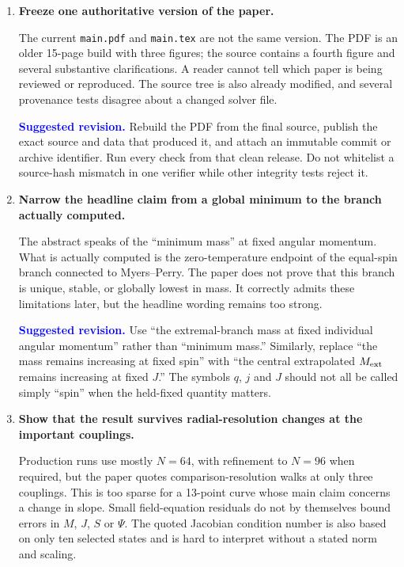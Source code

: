 \documentclass[11pt,a4paper]{article}
\newcommand{\issue}[1]{\textcolor{critical}{\textbf{#1}}}
\newcommand{\suggestion}[1]{\par\smallskip\noindent\textcolor{blue}{\textbf{Suggested revision.}} #1}
\begin{document}
\begin{enumerate}
\item \issue{Freeze one authoritative version of the paper.}

The current \texttt{main.pdf} and \texttt{main.tex} are not the same version.  The PDF is an older 15-page build with three figures; the source contains a fourth figure and several substantive clarifications.  A reader cannot tell which paper is being reviewed or reproduced.  The source tree is also already modified, and several provenance tests disagree about a changed solver file.

\suggestion{Rebuild the PDF from the final source, publish the exact source and data that produced it, and attach an immutable commit or archive identifier.  Run every check from that clean release.  Do not whitelist a source-hash mismatch in one verifier while other integrity tests reject it.}

\item \issue{Narrow the headline claim from a global minimum to the branch actually computed.}

The abstract speaks of the ``minimum mass'' at fixed angular momentum.  What is actually computed is the zero-temperature endpoint of the equal-spin branch connected to Myers--Perry.  The paper does not prove that this branch is unique, stable, or globally lowest in mass.  It correctly admits these limitations later, but the headline wording remains too strong.

\suggestion{Use ``the extremal-branch mass at fixed individual angular momentum'' rather than ``minimum mass.''  Similarly, replace ``the mass remains increasing at fixed spin'' with ``the central extrapolated $M_{\rm ext}$ remains increasing at fixed $J$.''  The symbols $q$, $j$ and $J$ should not all be called simply ``spin'' when the held-fixed quantity matters.}

\item \issue{Show that the result survives radial-resolution changes at the important couplings.}

Production runs use mostly $N=64$, with refinement to $N=96$ when required, but the paper quotes comparison-resolution walks at only three couplings.  This is too sparse for a 13-point curve whose main claim concerns a change in slope.  Small field-equation residuals do not by themselves bound errors in $M$, $J$, $S$ or $\Psi$.  The quoted Jacobian condition number is also based on only ten selected states and is hard to interpret without a stated norm and scaling.


\end{enumerate}
\end{document}
